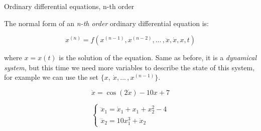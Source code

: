 \documentclass{beamer}
\begin{document}
\begin{frame}{Ordinary differential equations, n-th order}
\begin{flushleft}

The normal form of an \emph{n-th order} ordinary differential equation is:

\begin{equation}
	x^{(n)} = f (x^{(n-1)}, x^{(n-2)}, ...\,, \ddot{x}, \dot{x}, x, t)
\end{equation}
			
where $x = x(t)$ is the solution of the equation. Same as before, it is a \emph{dynamical system}, but this time we need more variables to describe the state of this system, for example we can use the set $\{ x, \ \dot{x} , ...\,,x^{(n-1)} \}$.

\begin{example}
\begin{equation}
    \ddot{x} = \cos(2\dot{x}) - 10 x + 7 
\end{equation}
\end{example}


\begin{example}
\begin{equation}
\begin{cases}
    \dddot{x}_1 = \dot{x}_1 + x_1 + x_2^2 - 4 \\
    \dddot{x}_2 = 10 x_1^3 + \ddot{x}_2
\end{cases}
\end{equation}
\end{example}

\end{flushleft}
\end{frame}
\end{document}
